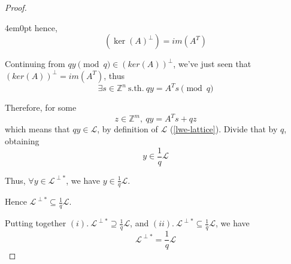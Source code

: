 \documentclass{article}
\theoremstyle{definition}
\newcommand{\Zz}{\mathbb{Z}}
\newcommand{\Ll}{\mathcal{L}}
\begin{document}
\begin{proof}
\begin{enumerate}[i.]
\begin{adjustwidth}{4em}{0pt}
      hence,
      $$(\ker(A)^\perp) = im(A^T)$$
    \end{adjustwidth}

    Continuing from $qy \pmod q \in (ker(A))^\perp$, we've just seen that $(ker(A))^\perp = im(A^T)$, thus
    $$\exists s \in \Zz^n ~\text{s.th.}~ qy=A^Ts \pmod q$$

    Therefore, for some
    $$z \in \Zz^m, ~ qy=A^Ts +qz$$
    which means that $qy \in \Ll$, by definition of $\Ll$ (\ref{lwe-lattice}). Divide that by $q$, obtaining
    $$y \in \frac{1}{q} \Ll$$

    Thus, $\forall y \in \Ll^{\perp *}$, we have $y \in \frac{1}{q} \Ll$.

    Hence $\Ll^{\perp *} \subseteq \frac{1}{q} \Ll$.
    \end{enumerate}

    \vspace{0.6cm}
    Putting together $(i).~ \Ll^{\perp *} \supseteq \frac{1}{q} \Ll$, and $(ii).~ \Ll^{\perp *} \subseteq \frac{1}{q} \Ll$, we have
    $$\Ll^{\perp *} = \frac{1}{q} \Ll$$
\end{proof}




\end{document}
